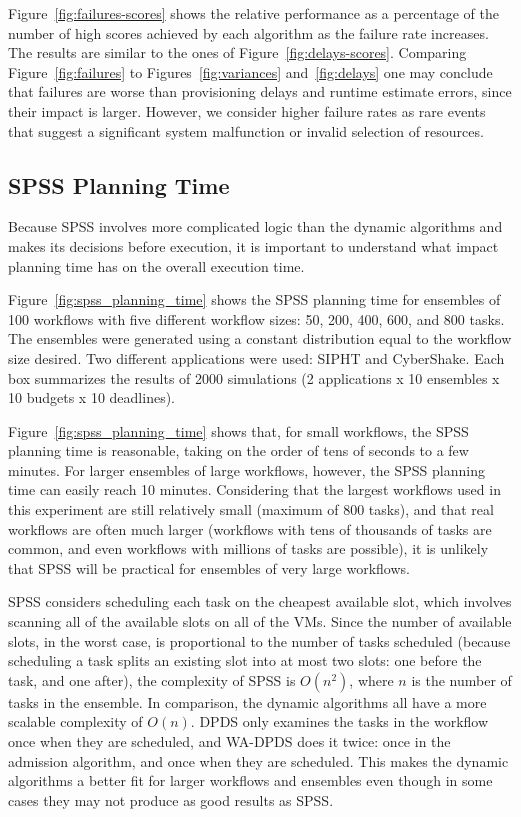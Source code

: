 \documentclass[preprint,5p]{elsarticle}
\begin{document}
Figure~\ref{fig:failures-scores} shows the relative performance as a percentage of
the number of high scores achieved by each algorithm as the failure rate
increases. The results are similar to the ones of
Figure~\ref{fig:delays-scores}. Comparing Figure~\ref{fig:failures} to
Figures~\ref{fig:variances} and~\ref{fig:delays} one may conclude that failures
are worse than provisioning delays and runtime estimate errors, since their
impact is larger. However, we consider higher failure rates as rare events that
suggest a significant system malfunction or invalid selection of resources.





\subsection{SPSS Planning Time}

Because SPSS involves more complicated logic than the dynamic algorithms and
makes its decisions before execution, it is important to understand what
impact planning time has on the overall execution time.

Figure~\ref{fig:spss_planning_time} shows the SPSS planning time for ensembles
of 100 workflows with five different workflow sizes: 50, 200, 400, 600, and
800 tasks. The ensembles were generated using a constant distribution equal to
the workflow size desired. Two different applications were used: SIPHT and
CyberShake. Each box summarizes the results of 2000 simulations (2
applications x 10 ensembles x 10 budgets x 10 deadlines).

Figure~\ref{fig:spss_planning_time} shows that, for small workflows, the SPSS
planning time is reasonable, taking on the order of tens of seconds to a few
minutes. For larger ensembles of large workflows, however, the SPSS planning
time can easily reach 10 minutes. Considering that the largest workflows used
in this experiment are still relatively small (maximum of 800 tasks), and that
real workflows are often much larger (workflows with tens of thousands of
tasks are common, and even workflows with millions of
tasks are possible), it is unlikely that SPSS will be practical for
ensembles of very large workflows.


SPSS considers scheduling each task on the cheapest available slot, which
involves scanning all of the available slots on all of the VMs. Since the number
of available slots, in the worst case, is proportional to the number of tasks
scheduled (because scheduling a task splits an existing slot into at most two
slots: one before the task, and one after), the complexity of SPSS is
$O(n^2)$, where $n$ is the number of tasks in the ensemble. In comparison, the
dynamic algorithms all have a more scalable complexity of $O(n)$. DPDS only
examines the tasks in the workflow once when they are scheduled, and WA-DPDS
does it twice: once in the admission algorithm, and once when they are
scheduled. This makes the dynamic algorithms a better fit for larger workflows
and ensembles even though in some cases they may not produce as good results
as SPSS.
\end{document}
